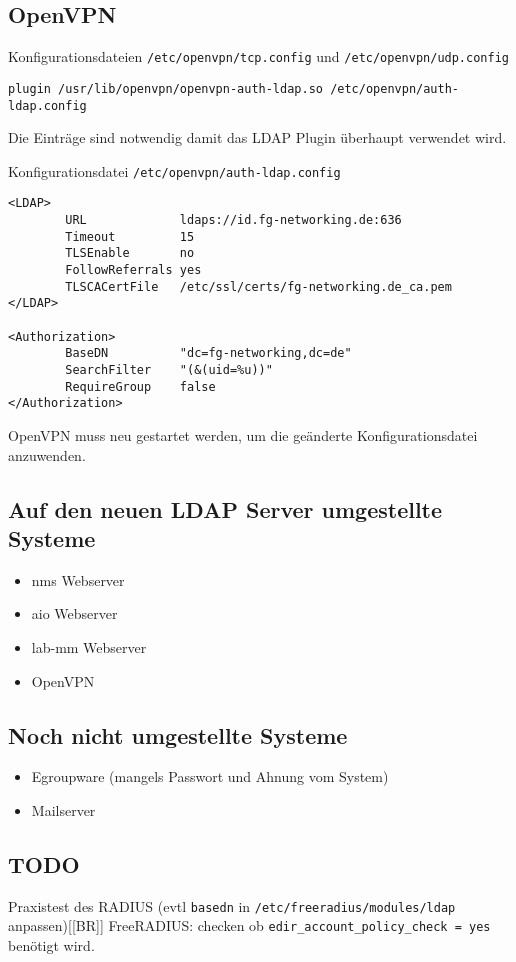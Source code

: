 \documentclass[11pt,a4paper,titlepage=firstiscover]{scrartcl} %
\begin{document}
\subsection{OpenVPN}
Konfigurationsdateien \texttt{/etc/openvpn/tcp.config} und \texttt{/etc/openvpn/udp.config}
\begin{lstlisting}
plugin /usr/lib/openvpn/openvpn-auth-ldap.so /etc/openvpn/auth-ldap.config
\end{lstlisting}
Die Einträge sind notwendig damit das LDAP Plugin überhaupt verwendet wird.

Konfigurationsdatei \texttt{/etc/openvpn/auth-ldap.config}
\begin{lstlisting}
<LDAP>
        URL             ldaps://id.fg-networking.de:636
        Timeout         15
        TLSEnable       no
        FollowReferrals yes
        TLSCACertFile   /etc/ssl/certs/fg-networking.de_ca.pem
</LDAP>

<Authorization>
        BaseDN          "dc=fg-networking,dc=de"
        SearchFilter    "(&(uid=%u))"
        RequireGroup    false
</Authorization>
\end{lstlisting}
OpenVPN muss neu gestartet werden, um die geänderte Konfigurationsdatei anzuwenden.


\subsection{Auf den neuen LDAP Server umgestellte Systeme}
\begin{itemize}
\item nms Webserver
\item aio Webserver
\item lab-mm Webserver
\item OpenVPN
\end{itemize}

\subsection{Noch nicht umgestellte Systeme}
\begin{itemize}
\item Egroupware (mangels Passwort und Ahnung vom System)
\item Mailserver
\end{itemize}

\subsection{TODO}
Praxistest des RADIUS (evtl \texttt{basedn} in \texttt{/etc/freeradius/modules/ldap} anpassen)[[BR]]
FreeRADIUS: checken ob \texttt{edir\_account\_policy\_check = yes} benötigt wird.
\end{document}
